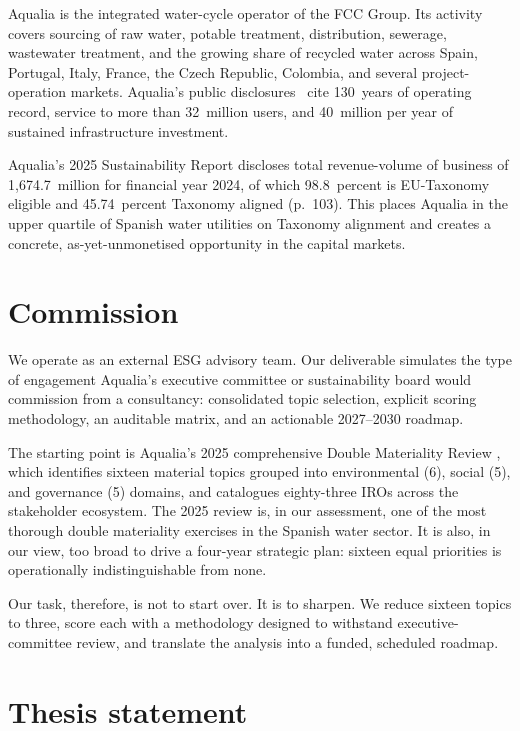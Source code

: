 \documentclass[11pt, a4paper, twoside, openright]{scrreprt}
\newcommand{\euro}{\texteuro}
\begin{document}
Aqualia is the integrated water-cycle operator of the FCC Group. Its activity covers sourcing of raw water, potable treatment, distribution, sewerage, wastewater treatment, and the growing share of recycled water across Spain, Portugal, Italy, France, the Czech Republic, Colombia, and several project-operation markets. Aqualia's public disclosures~\cite{aqualiaSR2024} cite 130~years of operating record, service to more than 32~million users, and \euro{}40~million per year of sustained infrastructure investment.

Aqualia's 2025 Sustainability Report \cite{aqualiaSR2024} discloses total revenue-volume of business of \euro{}1{,}674.7~million for financial year 2024, of which 98.8~percent is EU-Taxonomy eligible and 45.74~percent Taxonomy aligned (p.~103). This places Aqualia in the upper quartile of Spanish water utilities on Taxonomy alignment and creates a concrete, as-yet-unmonetised opportunity in the capital markets.

\section{Commission}

We operate as an external ESG advisory team. Our deliverable simulates the type of engagement Aqualia's executive committee or sustainability board would commission from a consultancy: consolidated topic selection, explicit scoring methodology, an auditable matrix, and an actionable 2027--2030 roadmap.

The starting point is Aqualia's 2025 comprehensive Double Materiality Review \cite{aqualiaDMReview2025}, which identifies sixteen material topics grouped into environmental (6), social (5), and governance (5) domains, and catalogues eighty-three IROs across the stakeholder ecosystem. The 2025 review is, in our assessment, one of the most thorough double materiality exercises in the Spanish water sector. It is also, in our view, too broad to drive a four-year strategic plan: sixteen equal priorities is operationally indistinguishable from none.

Our task, therefore, is not to start over. It is to sharpen. We reduce sixteen topics to three, score each with a methodology designed to withstand executive-committee review, and translate the analysis into a funded, scheduled roadmap.

\section{Thesis statement}
\end{document}
